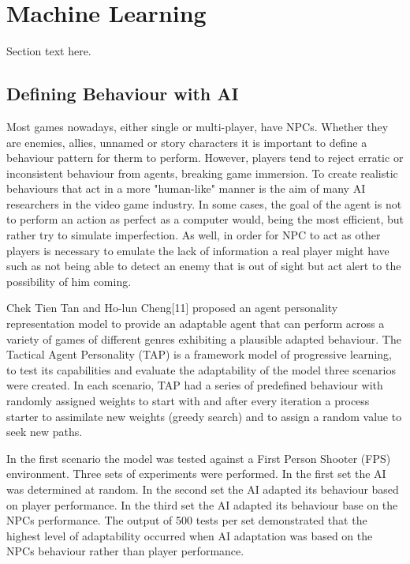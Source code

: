 \section{Machine Learning}
Section text here.
\vspace{2mm}

\subsection{Defining Behaviour with AI}
Most games nowadays, either single or multi-player, have NPCs. Whether they are enemies, allies, unnamed or story characters it is important to define a behaviour pattern for therm to perform. However, players tend to reject erratic or inconsistent behaviour from agents, breaking game immersion. To create realistic behaviours that act in a more "human-like" manner is the aim of many AI researchers in the video game industry. In some cases, the goal of the agent is not to perform an action as perfect as a computer would, being the most efficient, but rather try to simulate imperfection. As well, in order for NPC to act as other players is necessary to emulate the lack of information a real player might have such as not being able to detect an enemy that is out of sight but act alert to the possibility of him coming. 

\vspace{2mm}
Chek Tien Tan and Ho-lun Cheng[11] proposed an agent personality representation model to provide an adaptable agent that can perform across a variety of games of different genres exhibiting a plausible adapted behaviour. The Tactical Agent Personality (TAP) is a framework model of progressive learning, to test its capabilities and evaluate the adaptability of the model three scenarios were created. In each scenario, TAP had a series of predefined behaviour with randomly assigned weights to start with and after every iteration a process starter to assimilate new weights (greedy search) and to assign a random value to seek new paths.

\vspace{2mm}
In the first scenario the model was tested against a First Person Shooter (FPS) environment. Three sets of experiments were performed. In the first set the AI was determined at random. In the second set the AI adapted its behaviour based on player performance. In the third set the AI adapted its behaviour base on the NPCs performance. The output of 500 tests per set demonstrated that the highest level of adaptability occurred when AI adaptation was based on the NPCs behaviour rather than player performance.

